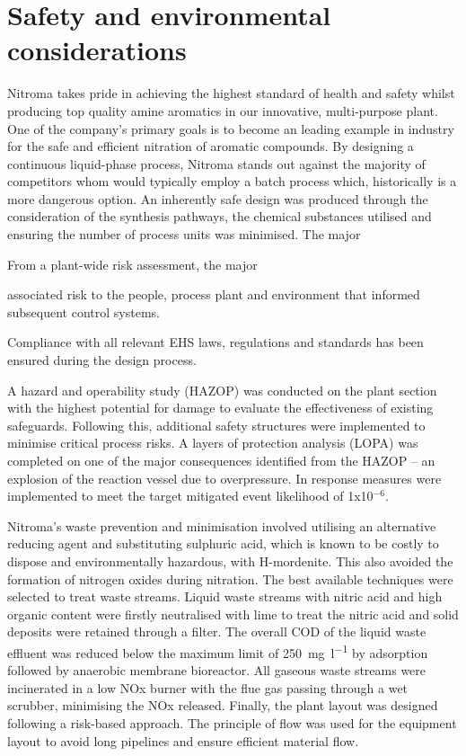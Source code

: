 \section*{Safety and environmental considerations}

Nitroma takes pride in achieving the highest standard of health and safety whilst producing top quality amine aromatics in our innovative, multi-purpose plant. One of the company's primary goals is to become an leading example in industry for the safe and efficient nitration of aromatic compounds. By designing a continuous liquid-phase process, Nitroma stands out against the majority of competitors whom would typically employ a batch process which, historically is a more dangerous option. An inherently safe design was produced through the consideration of the synthesis pathways, the chemical substances utilised and ensuring the number of process units was minimised. The major 

From a plant-wide risk assessment, the major 


associated risk to the people, process plant and environment that informed subsequent control systems.



 


 Compliance with all relevant EHS laws, regulations and standards has been ensured during the design process. 
 
 A hazard and operability study (HAZOP) was conducted on the plant section with the highest potential for damage to evaluate the effectiveness of existing safeguards. Following this, additional safety structures were implemented to minimise critical process risks. A layers of protection analysis (LOPA) was completed on one of the major consequences identified from the HAZOP – an explosion of the reaction vessel due to overpressure. In response measures were implemented to meet the target mitigated event likelihood of 1x10$^{-6}$.  

Nitroma's waste prevention and minimisation involved utilising an alternative reducing agent and substituting sulphuric acid, which is known to be costly to dispose and environmentally hazardous, with H-mordenite. This also avoided the formation of nitrogen oxides during nitration. The best available techniques  were selected to treat waste streams. Liquid waste streams with nitric acid and high organic content were firstly neutralised with lime to treat the nitric acid and solid deposits were retained through a filter. The overall COD of the liquid waste effluent was reduced below the maximum limit of \SI{250}{\mg\per\litre} by adsorption followed by anaerobic membrane bioreactor. All gaseous waste streams were incinerated in a low NOx burner with the flue gas passing through a wet scrubber, minimising the NOx released. Finally, the plant layout was designed following a risk-based approach. The principle of flow was used for the equipment layout to avoid long pipelines and ensure efficient material flow. 